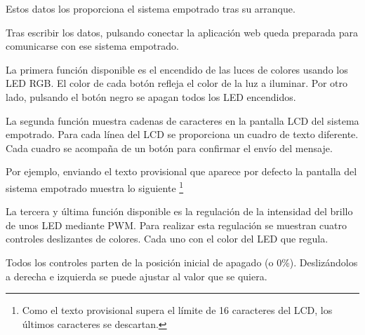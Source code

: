 
Estos datos los proporciona el sistema empotrado tras su arranque. 


Tras escribir los datos, pulsando conectar la aplicación web queda preparada
para comunicarse con ese sistema empotrado.


La primera función disponible es el encendido de las luces de colores usando
los LED RGB. El color de cada botón refleja el color de la luz a iluminar.
Por otro lado, pulsando el botón negro se apagan todos los LED encendidos.


La segunda función muestra cadenas de caracteres en la pantalla LCD del sistema
empotrado. Para cada línea del LCD se proporciona un cuadro de texto diferente.
Cada cuadro se acompaña de un botón para confirmar el envío del mensaje.


Por ejemplo, enviando el texto provisional que aparece por defecto la pantalla
del sistema empotrado muestra lo siguiente \footnote{Como el texto provisional
supera el límite de 16 caracteres del LCD, los últimos caracteres se descartan.}


La tercera y última función disponible es la regulación de la intensidad del
brillo de unos LED mediante PWM. Para realizar esta regulación se muestran 
cuatro controles deslizantes de colores. Cada uno con el color del LED que
regula.


Todos los controles parten de la posición inicial de apagado (o 0\%).
Deslizándolos a derecha e izquierda se puede ajustar al valor que se quiera.

